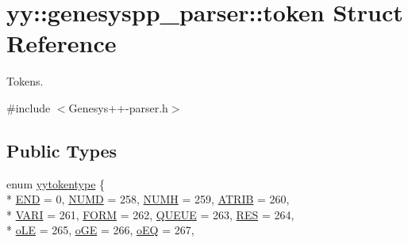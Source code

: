 \hypertarget{structyy_1_1genesyspp__parser_1_1token}{\section{yy\-:\-:genesyspp\-\_\-parser\-:\-:token Struct Reference}
\label{structyy_1_1genesyspp__parser_1_1token}
}


Tokens.  




{\ttfamily \#include $<$Genesys++-\/parser.\-h$>$}

\subsection*{Public Types}
\begin{DoxyCompactItemize}
\item 
enum \hyperlink{structyy_1_1genesyspp__parser_1_1token_a473652e1e69da7c38a16e5d2aaac94b9}{yytokentype} \{ \\*
\hyperlink{structyy_1_1genesyspp__parser_1_1token_a473652e1e69da7c38a16e5d2aaac94b9a00d2c86c290e7bf83326feb88f517338}{E\-N\-D} = 0, 
\hyperlink{structyy_1_1genesyspp__parser_1_1token_a473652e1e69da7c38a16e5d2aaac94b9ae56814371a4fd82749cbf4014e680988}{N\-U\-M\-D} = 258, 
\hyperlink{structyy_1_1genesyspp__parser_1_1token_a473652e1e69da7c38a16e5d2aaac94b9aded49131c63ecb89be85c9bd84edc20e}{N\-U\-M\-H} = 259, 
\hyperlink{structyy_1_1genesyspp__parser_1_1token_a473652e1e69da7c38a16e5d2aaac94b9aebe1769c282abd2f0720b197349f3b4c}{A\-T\-R\-I\-B} = 260, 
\\*
\hyperlink{structyy_1_1genesyspp__parser_1_1token_a473652e1e69da7c38a16e5d2aaac94b9a61a2a6258df01ed2035f269d5208643c}{V\-A\-R\-I} = 261, 
\hyperlink{structyy_1_1genesyspp__parser_1_1token_a473652e1e69da7c38a16e5d2aaac94b9ae7f7ca93c8e00b4e1f666b126aea62cb}{F\-O\-R\-M} = 262, 
\hyperlink{structyy_1_1genesyspp__parser_1_1token_a473652e1e69da7c38a16e5d2aaac94b9a7e689a413e2f3da72a09033ebed655a7}{Q\-U\-E\-U\-E} = 263, 
\hyperlink{structyy_1_1genesyspp__parser_1_1token_a473652e1e69da7c38a16e5d2aaac94b9a175fe4ef074543e5cbda2ab051de616d}{R\-E\-S} = 264, 
\\*
\hyperlink{structyy_1_1genesyspp__parser_1_1token_a473652e1e69da7c38a16e5d2aaac94b9af0a67b11a6b53b32936206f210d5039f}{o\-L\-E} = 265, 
\hyperlink{structyy_1_1genesyspp__parser_1_1token_a473652e1e69da7c38a16e5d2aaac94b9aa032c1fcf3fe9d06858a5290cfd93357}{o\-G\-E} = 266, 
\hyperlink{structyy_1_1genesyspp__parser_1_1token_a473652e1e69da7c38a16e5d2aaac94b9ac3dbe7ebfb0fc6a891760e0403da20c1}{o\-E\-Q} = 267, 

\end{DoxyCompactItemize}
